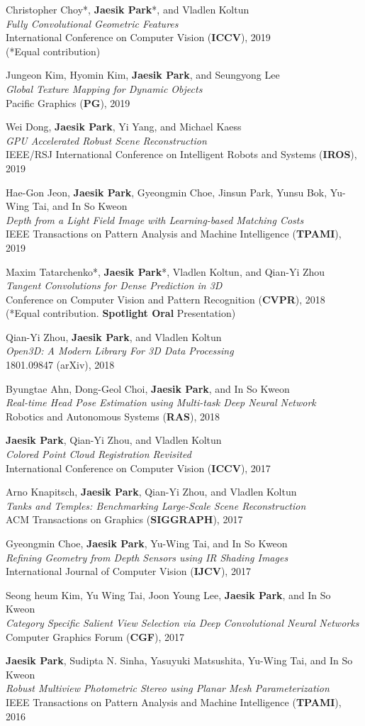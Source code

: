 \documentclass[letterpaper,11pt]{article}
\newcommand{\publicationItem}[4]{
  \small{
  \item{#1\\ \emph{#2}\\ #3\\ #4}
  }
}
\begin{document}
    \publicationItem{Christopher Choy*, \textbf{Jaesik Park}*, and Vladlen Koltun}{Fully Convolutional Geometric Features}{International Conference on Computer Vision (\textbf{ICCV}), 2019}{(*Equal contribution)}
    \publicationItem{Jungeon Kim, Hyomin Kim, \textbf{Jaesik Park}, and Seungyong Lee}{Global Texture Mapping for Dynamic Objects}{Pacific Graphics (\textbf{PG}), 2019}{}
    \publicationItem{Wei Dong, \textbf{Jaesik Park}, Yi Yang, and Michael Kaess}{GPU Accelerated Robust Scene Reconstruction}{IEEE/RSJ International Conference on Intelligent Robots and Systems (\textbf{IROS}), 2019}{}
    \publicationItem{Hae-Gon Jeon, \textbf{Jaesik Park}, Gyeongmin Choe, Jinsun Park, Yunsu Bok, Yu-Wing Tai, and In So Kweon}{Depth from a Light Field Image with Learning-based Matching Costs}{IEEE Transactions on Pattern Analysis and Machine Intelligence (\textbf{TPAMI}), 2019}{}
    \publicationItem{Maxim Tatarchenko*, \textbf{Jaesik Park}*, Vladlen Koltun, and Qian-Yi Zhou}{Tangent Convolutions for Dense Prediction in 3D}{Conference on Computer Vision and Pattern Recognition (\textbf{CVPR}), 2018}{(*Equal contribution. \textbf{Spotlight Oral} Presentation)}
    \publicationItem{Qian-Yi Zhou, \textbf{Jaesik Park}, and Vladlen Koltun}{Open3D: A Modern Library For 3D Data Processing}{1801.09847 (arXiv), 2018}{}
    \publicationItem{Byungtae Ahn, Dong-Geol Choi, \textbf{Jaesik Park}, and In So Kweon}{Real-time Head Pose Estimation using Multi-task Deep Neural Network}{Robotics and Autonomous Systems (\textbf{RAS}), 2018}{}
    \publicationItem{\textbf{Jaesik Park}, Qian-Yi Zhou, and Vladlen Koltun}{Colored Point Cloud Registration Revisited}{International Conference on Computer Vision (\textbf{ICCV}), 2017}{}
    \publicationItem{Arno Knapitsch, \textbf{Jaesik Park}, Qian-Yi Zhou, and Vladlen Koltun}{Tanks and Temples: Benchmarking Large-Scale Scene Reconstruction}{ACM Transactions on Graphics (\textbf{SIGGRAPH}), 2017}{}
    \publicationItem{Gyeongmin Choe, \textbf{Jaesik Park}, Yu-Wing Tai, and In So Kweon}{Refining Geometry from Depth Sensors using IR Shading Images}{International Journal of Computer Vision (\textbf{IJCV}), 2017}{}
    \publicationItem{Seong heum Kim, Yu Wing Tai, Joon Young Lee, \textbf{Jaesik Park}, and In So Kweon}{Category Specific Salient View Selection via Deep Convolutional Neural Networks}{Computer Graphics Forum (\textbf{CGF}), 2017}{}
    \publicationItem{\textbf{Jaesik Park}, Sudipta N. Sinha, Yasuyuki Matsushita, Yu-Wing Tai, and In So Kweon}{Robust Multiview Photometric Stereo using Planar Mesh Parameterization}{IEEE Transactions on Pattern Analysis and Machine Intelligence (\textbf{TPAMI}), 2016}{}
\end{document}
